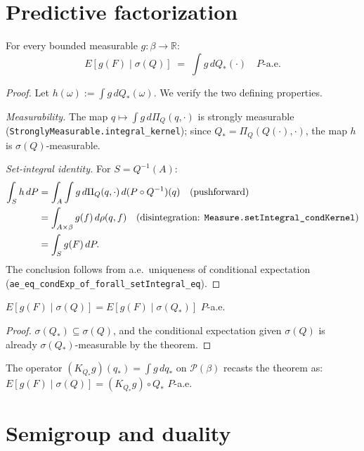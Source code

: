 \section{Predictive factorization}
\label{sec:factorization}

\begin{theorem}
\label{thm:predictive-factorization}
For every bounded measurable $g : \beta \to \mathbb{R}$:
\[
  E[g(F) \mid \sigma(Q)] \;=\; \int g\, dQ_*(\cdot)
  \quad P\text{-a.e.}
\]
\end{theorem}
\begin{proof}
Let $h(\omega) := \int g\, dQ_*(\omega)$.  We verify the two defining properties.

\emph{Measurability.}  The map $q \mapsto \int g\, d\Pi_Q(q, \cdot)$ is
strongly measurable (\texttt{StronglyMeasurable.integral\_kernel}); since
$Q_* = \Pi_Q(Q(\cdot), \cdot)$, the map $h$ is $\sigma(Q)$-measurable.

\emph{Set-integral identity.}  For $S = Q^{-1}(A)$:
\begin{align*}
  \int_S h\, dP
  &= \int_A \int g\, d\Pi_Q(q, \cdot)\, d(P \circ Q^{-1})(q)
  \quad\text{(pushforward)} \\
  &= \int_{A \times \beta} g(f)\, d\rho(q, f)
  \quad\text{(disintegration: \texttt{Measure.setIntegral\_condKernel})} \\
  &= \int_S g(F)\, dP.
\end{align*}
The conclusion follows from a.e.\ uniqueness of conditional expectation
(\texttt{ae\_eq\_condExp\_of\_forall\_setIntegral\_eq}).
\end{proof}

\begin{corollary}
\label{cor:sufficiency}
$E[g(F) \mid \sigma(Q)] = E[g(F) \mid \sigma(Q_*)]$ $P$-a.e.
\end{corollary}
\begin{proof}
$\sigma(Q_*) \subseteq \sigma(Q)$, and the conditional expectation given
$\sigma(Q)$ is already $\sigma(Q_*)$-measurable by the theorem.
\end{proof}

The operator $(K_{Q_*} g)(q_*) = \int g\, dq_*$ on $\mathcal{P}(\beta)$
recasts the theorem as: $E[g(F) \mid \sigma(Q)] = (K_{Q_*} g) \circ Q_*$
$P$-a.e.

\section{Semigroup and duality}
\label{sec:semigroup}


